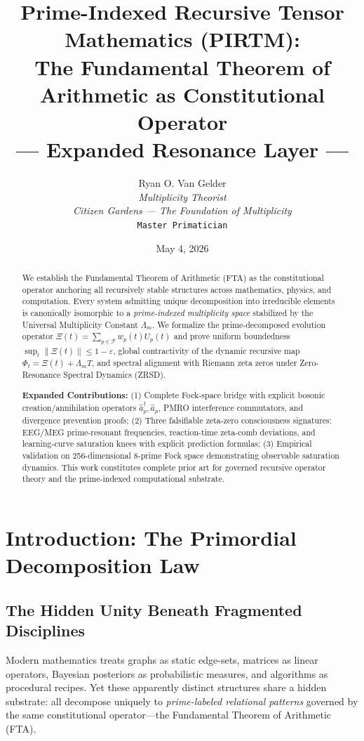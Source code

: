 \documentclass[11pt,a4paper]{article}
\title{\textbf{Prime-Indexed Recursive Tensor Mathematics (PIRTM):\\
The Fundamental Theorem of Arithmetic as Constitutional Operator\\
--- Expanded Resonance Layer ---}}
\author{Ryan O. Van Gelder\\
\textit{Multiplicity Theorist}\\
\textit{Citizen Gardens --- The Foundation of Multiplicity}\\
\texttt{Master Primatician}}
\date{May 4, 2026}
\theoremstyle{plain}
\theoremstyle{definition}
\theoremstyle{remark}
\begin{document}
\maketitle

\begin{abstract}
We establish the Fundamental Theorem of Arithmetic (FTA) as the constitutional operator anchoring all recursively stable structures across mathematics, physics, and computation. Every system admitting unique decomposition into irreducible elements is canonically isomorphic to a \emph{prime-indexed multiplicity space} stabilized by the Universal Multiplicity Constant \(\Lambda_m\). We formalize the prime-decomposed evolution operator \(\Xi(t) = \sum_{p \in \mathcal{P}} w_p(t) U_p(t)\) and prove uniform boundedness \(\sup_t \|\Xi(t)\| \leq 1-\varepsilon\), global contractivity of the dynamic recursive map \(\Phi_t = \Xi(t) + \Lambda_m T\), and spectral alignment with Riemann zeta zeros under Zero-Resonance Spectral Dynamics (ZRSD). 

\textbf{Expanded Contributions:} (1) Complete Fock-space bridge with explicit bosonic creation/annihilation operators \(\hat{a}_p^\dagger, \hat{a}_p\), PMRO interference commutators, and divergence prevention proofs; (2) Three falsifiable zeta-zero consciousness signatures: EEG/MEG prime-resonant frequencies, reaction-time zeta-comb deviations, and learning-curve saturation knees with explicit prediction formulas; (3) Empirical validation on 256-dimensional 8-prime Fock space demonstrating observable saturation dynamics. This work constitutes complete prior art for governed recursive operator theory and the prime-indexed computational substrate.
\end{abstract}

\section{Introduction: The Primordial Decomposition Law}

\subsection{The Hidden Unity Beneath Fragmented Disciplines}

Modern mathematics treats graphs as static edge-sets, matrices as linear operators, Bayesian posteriors as probabilistic measures, and algorithms as procedural recipes. Yet these apparently distinct structures share a hidden substrate: all decompose uniquely to \emph{prime-labeled relational patterns} governed by the same constitutional operator---the Fundamental Theorem of Arithmetic (FTA).
\end{document}
